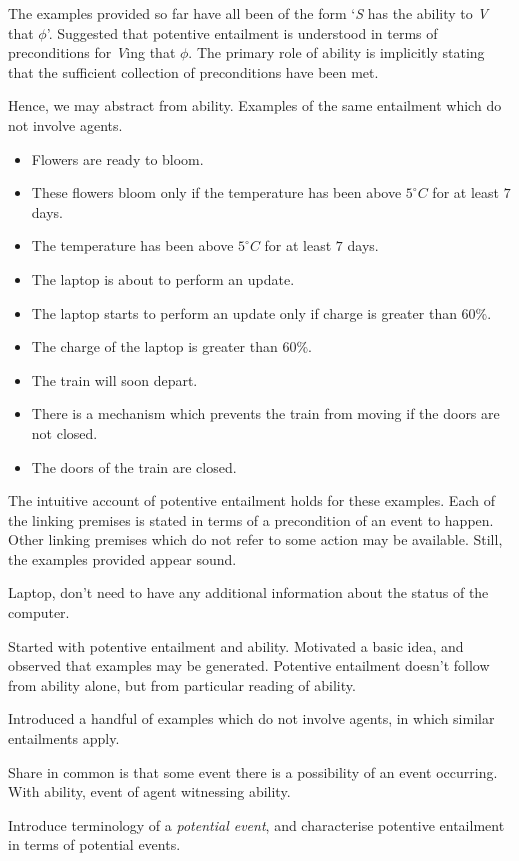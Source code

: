 \begin{note}[Event]
  The examples provided so far have all been of the form `\emph{S} has the ability to \emph{V} that \(\phi\)'.
  Suggested that potentive entailment is understood in terms of preconditions for \emph{V}ing that \(\phi\).
  The primary role of ability is implicitly stating that the sufficient collection of preconditions have been met.

  Hence, we may abstract from ability.
  Examples of the same entailment which do not involve agents.

  \begin{itemize}
  \item Flowers are ready to bloom.
  \item These flowers bloom only if the temperature has been above \(5^{\circ}C\) for at least \(7\) days.
  \item The temperature has been above \(5^{\circ}C\) for at least \(7\) days.
  \end{itemize}

  \begin{itemize}
  \item The laptop is about to perform an update.
  \item The laptop starts to perform an update only if charge is greater than \(60\%\).
  \item The charge of the laptop is greater than \(60\%\).
  \end{itemize}

  \begin{itemize}
  \item The train will soon depart.
  \item There is a mechanism which prevents the train from moving if the doors are not closed.
  \item The doors of the train are closed.
  \end{itemize}

  The intuitive account of potentive entailment holds for these examples.
  Each of the linking premises is stated in terms of a precondition of an event to happen.
  Other linking premises which do not refer to some action may be available.
  Still, the examples provided appear sound.

  Laptop, don't need to have any additional information about the status of the computer.
\end{note}

\begin{note}[Moving on]
  Started with potentive entailment and ability.
  Motivated a basic idea, and observed that examples may be generated.
  Potentive entailment doesn't follow from ability alone, but from particular reading of ability.

  Introduced a handful of examples which do not involve agents, in which similar entailments apply.

  Share in common is that some event there is a possibility of an event occurring.
  With ability, event of agent witnessing ability.

  Introduce terminology of a \emph{potential event}, and characterise potentive entailment in terms of potential events.
\end{note}

